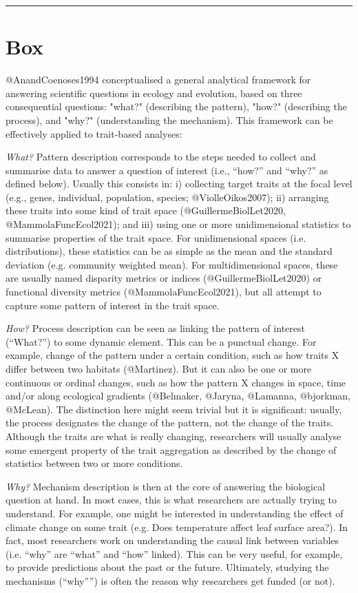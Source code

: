 \documentclass[12pt,letterpaper]{article}
\begin{document}
\break

\hrule
\section*{Box}
@AnandCoenoses1994 conceptualised a general analytical framework for answering scientific questions in ecology and evolution, based on three consequential questions: "what?" (describing the pattern), "how?" (describing the process), and "why?" (understanding the mechanism).
This framework can be effectively applied to trait-based analyses:

\textit{What?} Pattern description corresponds to the steps needed to collect and summarise data to answer a question of interest (i.e., “how?” and “why?” as defined below).
Usually this consists in: i) collecting target traits at the focal level (e.g., genes, individual, population, species; @ViolleOikos2007); ii) arranging these traits into some kind of trait space (@GuillermeBiolLet2020, @MammolaFuncEcol2021); and iii) using one or more unidimensional statistics to summarise properties of the trait space.
For unidimensional spaces (i.e. distributions), these statistics can be as simple as the mean and the standard deviation (e.g.
 community weighted mean).
For multidimensional spaces, these are usually named disparity metrics or indices (@GuillermeBiolLet2020) or functional diversity metrics (@MammolaFuncEcol2021), but all attempt to capture some pattern of interest in the trait space.

\textit{How?} Process description can be seen as linking the pattern of interest (“What?”) to some dynamic element.
This can be a punctual change.
For example, change of the pattern under a certain condition, such as how traits X differ between two habitats (@Martinez).
But it can also be one or more continuous or ordinal changes, such as how the pattern X changes in space, time and/or along ecological gradients (@Belmaker, @Jaryna, @Lamanna, @bjorkman, @McLean).
The distinction here might seem trivial but it is significant: usually, the process designates the change of the pattern, not the change of the traits.
Although the traits are what is really changing, researchers will usually analyse some emergent property of the trait aggregation as described by the change of statistics between two or more conditions.

\textit{Why?} Mechanism description is then at the core of answering the biological question at hand.
In most cases, this is what researchers are actually trying to understand.
For example, one might be interested in understanding the effect of climate change on some trait (e.g. Does temperature affect leaf surface area?).
In fact, most researchers work on understanding the causal link between variables (i.e. “why” are “what” and “how” linked).
This can be very useful, for example, to provide predictions about the past or the future.
Ultimately, studying the mechanisms (“why””) is often the reason why researchers get funded (or not).
\end{document}
